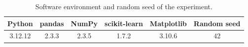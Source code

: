 \begin{table}[ht]
  \centering
  \caption{Software environment and random seed of the experiment.}
  \label{tab:software}
  \small
  \begin{tabular*}{\textwidth}{@{\extracolsep{\fill}}cccccc@{}}
    \toprule
    Python & pandas & NumPy & scikit-learn & Matplotlib & Random seed \\
    \midrule
    3.12.12 & 2.3.3 & 2.3.5 & 1.7.2 & 3.10.6 & 42 \\
    \bottomrule
  \end{tabular*}
\end{table}
